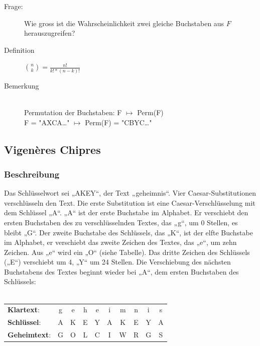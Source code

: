 \documentclass[landscape,twocolumn,a4paper]{article}
\newcommand{\Sum}[2]{\sum_{#2}^{#1}} %
\begin{document}
\begin{description}
	\item[Frage:] Wie gross ist die Wahrscheinlichkeit zwei gleiche Buchstaben aus $F$ herauszugreifen?
	\item[Definition] \fbox{$\mathbf{IC_F}=\frac{\Sum{26}{1}{n_i\choose2}}{{n\choose2}}$} {\color{gray}${n \choose k}=\frac{n!}{k!*(n-k)!}$}

	\item[Bemerkung] \hfill \\
		Permutation der Buchstaben: F $\mapsto$ Perm(F)  \\
		F = "{}AXCA\dots" $\mapsto$ Perm(F) = "{}CBYC\dots" \\
		
\end{description}

\subsection{Vigenères Chipres}
\subsubsection{Beschreibung}
Das Schlüsselwort sei „AKEY“, der Text „geheimnis“. Vier Caesar-Substitutionen verschlüsseln den Text. Die erste Substitution ist eine Caesar-Verschlüsselung mit dem Schlüssel „A“. „A“ ist der erste Buchstabe im Alphabet. Er verschiebt den ersten Buchstaben des zu verschlüsselnden Textes, das „g“, um 0 Stellen, es bleibt „G“. Der zweite Buchstabe des Schlüssels, das „K“, ist der elfte Buchstabe im Alphabet, er verschiebt das zweite Zeichen des Textes, das „e“, um zehn Zeichen. Aus „e“ wird ein „O“ (siehe Tabelle). Das dritte Zeichen des Schlüssels („E“) verschiebt um 4, „Y“ um 24 Stellen. Die Verschiebung des nächsten Buchstabens des Textes beginnt wieder bei „A“, dem ersten Buchstaben des Schlüssels: \\ \\
\begin{tabular}{l c c c c c c c c c }
	\textbf{Klartext}: & g & e & h & e & i & m & n & i & s \\
	\textbf{Schlüssel}: & A & K & E & Y & A & K & E & Y & A \\
	\textbf{Geheimtext}: & G & O & L & C & I & W & R & G & S 
\end{tabular}
\end{document}

